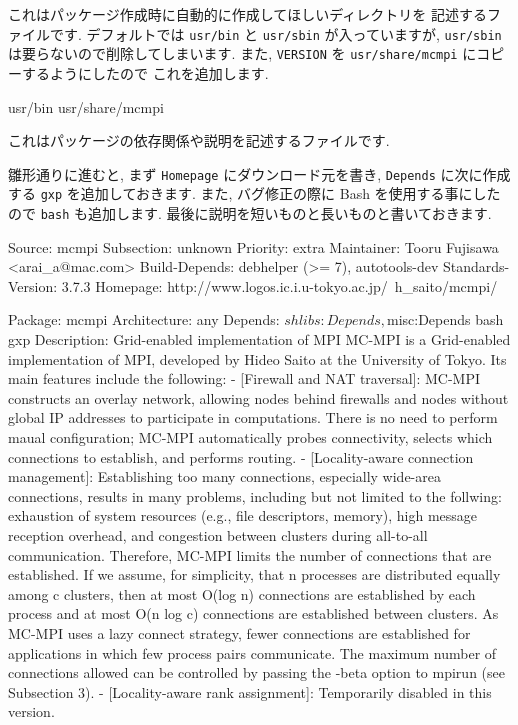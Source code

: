 \documentclass[mingoth,a4paper]{jsarticle}
\begin{document}

これはパッケージ作成時に自動的に作成してほしいディレクトリを
記述するファイルです.
デフォルトでは \verb|usr/bin| と \verb|usr/sbin| が入っていますが,
\verb|usr/sbin| は要らないので削除してしまいます.
また, \verb|VERSION| を \verb|usr/share/mcmpi| にコピーするようにしたので
これを追加します.

\begin{commandline}
usr/bin
usr/share/mcmpi
\end{commandline}


これはパッケージの依存関係や説明を記述するファイルです.

雛形通りに進むと, まず \verb|Homepage| にダウンロード元を書き,
\verb|Depends| に次に作成する \verb|gxp| を追加しておきます.
また, バグ修正の際に Bash を使用する事にしたので \verb|bash| も追加します.
最後に説明を短いものと長いものと書いておきます.

\begin{commandline}
Source: mcmpi
Subsection: unknown
Priority: extra
Maintainer: Tooru Fujisawa <arai_a@mac.com>
Build-Depends: debhelper (>= 7), autotools-dev
Standards-Version: 3.7.3
Homepage: http://www.logos.ic.i.u-tokyo.ac.jp/~h_saito/mcmpi/

Package: mcmpi
Architecture: any
Depends: ${shlibs:Depends}, ${misc:Depends} bash gxp
Description: Grid-enabled implementation of MPI
  MC-MPI is a Grid-enabled implementation of MPI, developed by Hideo
  Saito at the University of Tokyo.  Its main features include the
  following:
  - [Firewall and NAT traversal]: MC-MPI constructs an overlay
    network, allowing nodes behind firewalls and nodes without global
    IP addresses to participate in computations.  There is no need to
    perform maual configuration; MC-MPI automatically probes
    connectivity, selects which connections to establish, and performs
    routing.
  - [Locality-aware connection management]: Establishing too many
    connections, especially wide-area connections, results in many
    problems, including but not limited to the follwing: exhaustion of
    system resources (e.g., file descriptors, memory), high message
    reception overhead, and congestion between clusters during
    all-to-all communication.  Therefore, MC-MPI limits the number of
    connections that are established.  If we assume, for simplicity,
    that n processes are distributed equally among c clusters, then at
    most O(log n) connections are established by each process and at
    most O(n log c) connections are established between clusters.  As
    MC-MPI uses a lazy connect strategy, fewer connections are
    established for applications in which few process pairs
    communicate.  The maximum number of connections allowed can be
    controlled by passing the -beta option to mpirun (see Subsection 3).
  - [Locality-aware rank assignment]: Temporarily disabled in this
    version.
\end{commandline}
\end{document}
